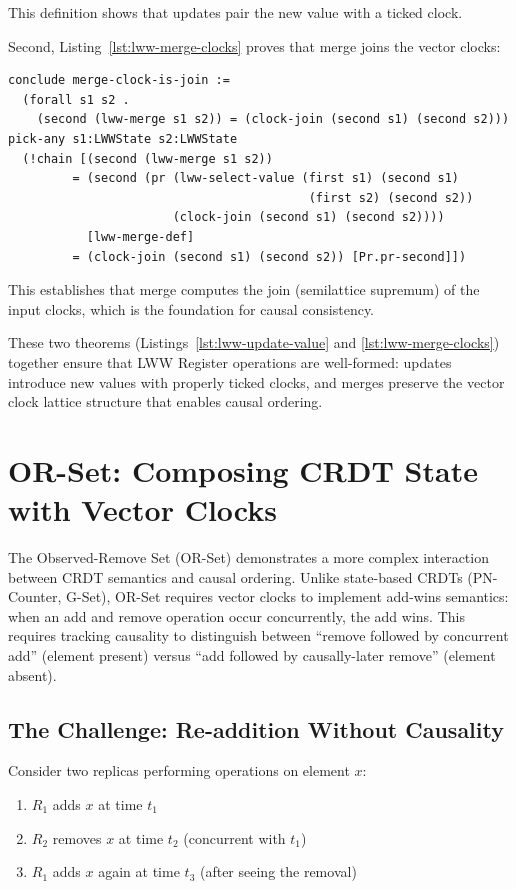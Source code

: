 This definition shows that updates pair the new value with a ticked clock.

Second, Listing~\ref{lst:lww-merge-clocks} proves that merge joins the vector clocks:

\begin{lstlisting}[language=Athena,style=athena,label={lst:lww-merge-clocks},caption={LWW Register: Merge joins clocks}]
conclude merge-clock-is-join :=
  (forall s1 s2 .
    (second (lww-merge s1 s2)) = (clock-join (second s1) (second s2)))
pick-any s1:LWWState s2:LWWState
  (!chain [(second (lww-merge s1 s2))
         = (second (pr (lww-select-value (first s1) (second s1) 
                                          (first s2) (second s2))
                       (clock-join (second s1) (second s2))))
           [lww-merge-def]
         = (clock-join (second s1) (second s2)) [Pr.pr-second]])
\end{lstlisting}

This establishes that merge computes the join (semilattice supremum) of the input clocks, which is the foundation for causal consistency.

These two theorems (Listings~\ref{lst:lww-update-value} and \ref{lst:lww-merge-clocks}) together ensure that LWW Register operations are well-formed: updates introduce new values with properly ticked clocks, and merges preserve the vector clock lattice structure that enables causal ordering.

\section{OR-Set: Composing CRDT State with Vector Clocks}\label{sec:orset}

The Observed-Remove Set (OR-Set) demonstrates a more complex interaction between CRDT semantics and causal ordering. Unlike state-based CRDTs (PN-Counter, G-Set), OR-Set requires vector clocks to implement add-wins semantics: when an add and remove operation occur concurrently, the add wins. This requires tracking causality to distinguish between ``remove followed by concurrent add'' (element present) versus ``add followed by causally-later remove'' (element absent).

\subsection{The Challenge: Re-addition Without Causality}

Consider two replicas performing operations on element $x$:
\begin{enumerate}
  \item $R_1$ adds $x$ at time $t_1$
  \item $R_2$ removes $x$ at time $t_2$ (concurrent with $t_1$)
  \item $R_1$ adds $x$ again at time $t_3$ (after seeing the removal)
\end{enumerate}

